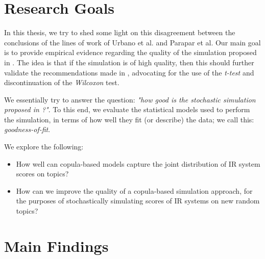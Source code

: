 \section{Research Goals}

In this thesis, we try to shed some light on this disagreement between the conclusions of the lines of work of Urbano et al. and Parapar et al. Our main goal is to provide empirical evidence regarding the quality of the simulation proposed in \cite{Urbano2018}. The idea is that if the simulation is of high quality, then this should further validate the recommendations made in \cite{Urbano2019}, advocating for the use of the \textit{t-test} and discontinuation of the \textit{Wilcoxon} test.

We essentially try to answer the question: \textit{"how good is the stochastic simulation proposed in \cite{Urbano2018}?"}. To this end, we evaluate the statistical models used to perform the simulation, in terms of how well they fit (or describe) the data; we call this: \textit{goodness-of-fit}.

We explore the following:

\begin{itemize}
	\item How well can copula-based models capture the joint distribution of IR system scores on topics?
	
	\item How can we improve the quality of a copula-based simulation approach, for the purposes of stochastically simulating scores of IR systems on new random topics?
	
%		
\end{itemize}

\section{Main Findings}



